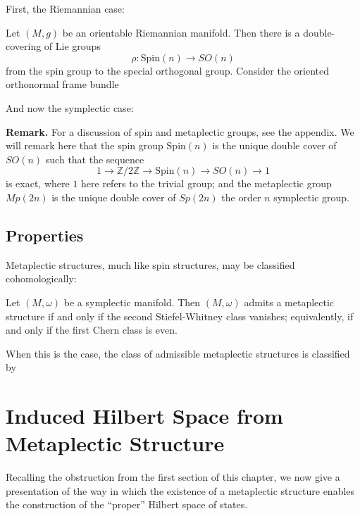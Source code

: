 First, the Riemannian case:
\begin{defn}
Let $(M,g)$ be an orientable Riemannian manifold. Then there is a double-covering of Lie groups
$$
\rho : \mathrm{Spin}(n) \to SO(n)
$$
from the spin group to the special orthogonal group. Consider the oriented orthonormal frame bundle %
\end{defn}
And now the symplectic case:
\begin{defn}
\end{defn}

\textbf{Remark.} For a discussion of spin and metaplectic groups, see the appendix. We will remark here that the spin group $\mathrm{Spin}(n)$ is the unique double cover of $SO(n)$ such that the sequence
$$
1 \to \mathbb{Z}/2\mathbb{Z} \to \mathrm{Spin}(n) \to SO(n) \to 1
$$
is exact, where $1$ here refers to the trivial group; and the metaplectic group $Mp(2n)$ is the unique double cover of $Sp(2n)$ the order $n$ symplectic group.

\subsection{Properties}
Metaplectic structures, much like spin structures, may be classified cohomologically:
\begin{thrm}
Let $(M,\omega)$ be a symplectic manifold. Then $(M,\omega)$ admits a metaplectic structure if and only if the second Stiefel-Whitney class vanishes; equivalently, if and only if the first Chern class is even.


When this is the case, the class of admissible metaplectic structures is classified by %
\end{thrm}









\section{Induced Hilbert Space from Metaplectic Structure}
Recalling the obstruction from the first section of this chapter, we now give a presentation of the way in which the existence of a metaplectic structure enables the construction of the ``proper'' Hilbert space of states.

